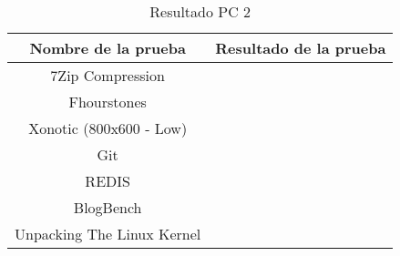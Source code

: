 \documentclass[12pt]{article}
\begin{document}
\begin{table}[!htb]
    \centering
    \begin{tabular}{|c|c|}
        \hline
        \textbf{Nombre de la prueba} & \textbf{Resultado de la prueba}\\
        \hline
        7Zip Compression &  \\
        \hline
        Fhourstones &  \\
        \hline
        Xonotic (800x600 - Low) &  \\
        \hline
        Git &  \\
        \hline
        REDIS &  \\
        \hline
        BlogBench &  \\
        \hline
        Unpacking The Linux Kernel &  \\
        \hline
    \end{tabular}
    \caption{Resultado PC 2}
\end{table}
\end{document}
